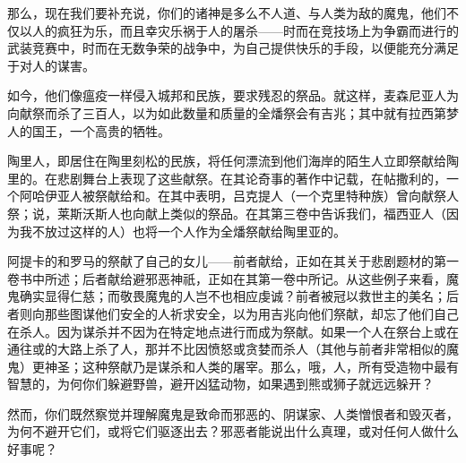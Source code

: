 那么，现在我们要补充说，你们的诸神是多么不人道、与人类为敌的魔鬼，他们不仅以人的疯狂为乐，而且幸灾乐祸于人的屠杀——时而在竞技场上为争霸而进行的武装竞赛中，时而在无数争荣的战争中，为自己提供快乐的手段，以便能充分满足于对人的谋害。\par

如今，他们像瘟疫一样侵入城邦和民族，要求残忍的祭品。就这样，麦森尼亚人为向献祭而杀了三百人，以为如此数量和质量的全燔祭会有吉兆；其中就有拉西第梦人的国王，一个高贵的牺牲。\par

陶里人，即居住在陶里刻松的民族，将任何漂流到他们海岸的陌生人立即祭献给陶里的。在悲剧舞台上表现了这些献祭。在其论奇事的著作中记载，在帖撒利的，一个阿哈伊亚人被祭献给和。在其中表明，吕克提人（一个克里特种族）曾向献祭人祭；说，莱斯沃斯人也向献上类似的祭品。在其第三卷中告诉我们，福西亚人（因为我不放过这样的人）也将一个人作为全燔祭献给陶里亚的。\par

阿提卡的和罗马的祭献了自己的女儿——前者献给，正如在其关于悲剧题材的第一卷书中所述；后者献给避邪恶神祇，正如在其第一卷中所记。从这些例子来看，魔鬼确实显得仁慈；而敬畏魔鬼的人岂不也相应虔诚？前者被冠以救世主的美名；后者则向那些图谋他们安全的人祈求安全，以为用吉兆向他们祭献，却忘了他们自己在杀人。因为谋杀并不因为在特定地点进行而成为祭献。如果一个人在祭台上或在通往或的大路上杀了人，那并不比因愤怒或贪婪而杀人（其他与前者非常相似的魔鬼）更神圣；这种祭献乃是谋杀和人类的屠宰。那么，哦，人，所有受造物中最有智慧的，为何你们躲避野兽，避开凶猛动物，如果遇到熊或狮子就远远躲开？\par

\par

然而，你们既然察觉并理解魔鬼是致命而邪恶的、阴谋家、人类憎恨者和毁灭者，为何不避开它们，或将它们驱逐出去？邪恶者能说出什么真理，或对任何人做什么好事呢？\par

